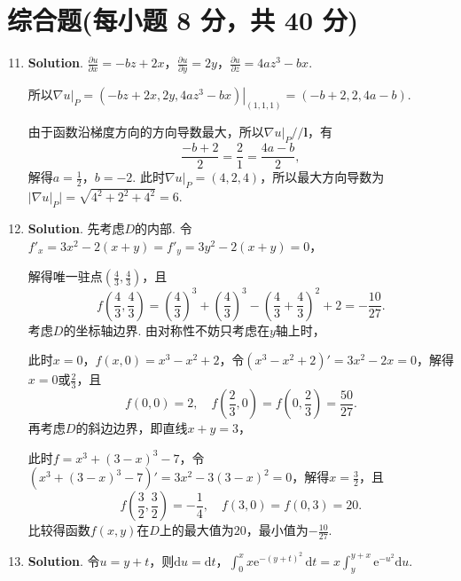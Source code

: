 \documentclass[../main.tex]{subfiles}
\begin{document}
\section{综合题(每小题 8 分，共 40 分)}
\begin{enumerate}
    \setcounter{enumi}{10}
    \item \textbf{Solution}. $\frac{\partial u}{\partial x}= -bz+2x$，$\frac{\partial
                  u}{\partial y}= 2y$，$\frac{\partial u}{\partial z}= 4az^{3}-bx$.

          所以$\nabla u|_{P}= \left.(-bz+2x,2y,4az^{3}-bx)\right|_{(1,1,1)}= (-b+2,2,
              4a-b)$.

          由于函数沿梯度方向的方向导数最大，所以$\nabla u|_{P}//\boldsymbol{l}$，有
          \[
              \frac{-b+2}{2}= \frac{2}{1}= \frac{4a-b}{2},
          \]
          解得$a=\frac{1}{2}$，$b=-2$. 此时$\nabla u|_{P}= (4,2,4)$，所以最大方向导数为$|
              \nabla u|_{P}| = \sqrt{4^{2}+2^{2}+4^{2}}= 6$.

    \item \textbf{Solution}. 先考虑$D$的内部. 令$f'_{x}= 3x^{2}-2(x+y) = f'_{y}
              = 3y^{2}-2(x+y) = 0$，

          解得唯一驻点$\left(\frac{4}{3},\frac{4}{3}\right)$，且
          \[
              f\left(\frac{4}{3},\frac{4}{3}
              \right)=\left(\frac{4}{3}\right)^{3}+\left(\frac{4}{3}\right)^{3}-\left(\frac{4}{3}
              +\frac{4}{3}\right)^{2}+ 2=-\frac{10}{27}.
          \]
          考虑$D$的坐标轴边界. 由对称性不妨只考虑在$y$轴上时，

          此时$x=0$，$f(x,0) = x^{3}-x^{2}+2$，令$\left(x^{3}-x^{2}+2\right)'=3x^{2}-
              2x=0$，解得$x=0$或$\frac{2}{3}$，且
          \[
              f\left(0,0\right) = 2,\quad f\left(\frac{2}{3},0\right) = f\left(0,\frac{2}{3}
              \right) = \frac{50}{27}.
          \]
          再考虑$D$的斜边边界，即直线$x+y=3$，

          此时$f = x^{3}+(3-x)^{3}-7$，令$\left(x^{3}+(3-x)^{3}-7\right)' = 3x^{2}-3(
                  3-x)^{2}=0$，解得$x=\frac{3}{2}$，且
          \[
              f\left(\frac{3}{2},\frac{3}{2}\right) = -\frac{1}{4},\quad f(3,0)=f(0,3) = 20.
          \]
          比较得函数$f(x,y)$在$D$上的最大值为$20$，最小值为$-\frac{10}{27}$.

    \item \textbf{Solution}. 令$u=y+t$，则$\mathrm{d}u = \mathrm{d}t$，$\int
              _{0}^{x}x\mathrm{e}^{-(y+t)^2}\,\mathrm{d}t = x\int_{y}^{y+x}\mathrm{e}^{-u^2}
              \mathrm{d}u$.


\end{enumerate}
\end{document}
